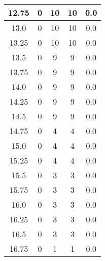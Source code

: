 \documentclass[letterpaper, 12pt]{article}
\begin{document}
\begin{longtable}{|c|c|c|c|c|}
\hline
12.75 & 0 & 10 & 10 & 0.0 \\
\hline
13.0 & 0 & 10 & 10 & 0.0 \\
\hline
13.25 & 0 & 10 & 10 & 0.0 \\
\hline
13.5 & 0 & 9 & 9 & 0.0 \\
\hline
13.75 & 0 & 9 & 9 & 0.0 \\
\hline
14.0 & 0 & 9 & 9 & 0.0 \\
\hline
14.25 & 0 & 9 & 9 & 0.0 \\
\hline
14.5 & 0 & 9 & 9 & 0.0 \\
\hline
14.75 & 0 & 4 & 4 & 0.0 \\
\hline
15.0 & 0 & 4 & 4 & 0.0 \\
\hline
15.25 & 0 & 4 & 4 & 0.0 \\
\hline
15.5 & 0 & 3 & 3 & 0.0 \\
\hline
15.75 & 0 & 3 & 3 & 0.0 \\
\hline
16.0 & 0 & 3 & 3 & 0.0 \\
\hline
16.25 & 0 & 3 & 3 & 0.0 \\
\hline
16.5 & 0 & 3 & 3 & 0.0 \\
\hline
16.75 & 0 & 1 & 1 & 0.0 \\
\hline
\end{longtable}
\end{document}
